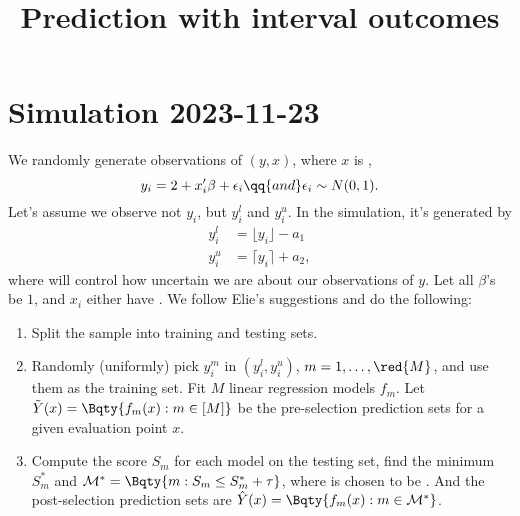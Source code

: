 \documentclass[12pt]{article}
\begin{document}
    \title{Prediction with interval outcomes}

    \section{Simulation 2023-11-23}

    We randomly generate  observations of \((y,x)\), where \(x\) is ,
    \begin{equation*}
        y_{i} = 2 + x_{i}' \beta + \epsilon_{i}\qq{and} \epsilon_{i} \sim N(0,1).
    \end{equation*}
    Let's assume we observe not \(y_{i}\), but \(y^{l}_{i}\) and \(y_{i}^{u}\). In the simulation, it's generated by 
    \begin{align*}
        y_{i}^{l} &= \lfloor y_{i} \rfloor - a_{1} \\
        y_{i}^{u} &= \lceil y_{i} \rceil  + a_{2},
    \end{align*}
    where  will control how uncertain we are about our observations of \(y\). Let all \(\beta\)'s be \(1\), and \(x_{i}\) either have . We follow Elie's suggestions and do the following:
    \begin{enumerate}
        \item Split the sample into training and testing sets. 
        \item Randomly (uniformly) pick \(y^{m}_{i}\) in \((y^{l}_{i}, y^{u}_{i})\), \(m = 1,\dots, \red{M}\), and use them as the training set. Fit \(M\) linear regression models \(f_{m}\). Let \(\tilde{Y}(x) = \Bqty{f_{m}(x): m\in [M]}\) be the pre-selection prediction sets for a given evaluation point \(x\).
        \item Compute the score \(S_{m}\) for each model on the testing set, find the  minimum \(S_{m}^{*}\) and \(\mathcal{M}^{*} = \Bqty{m: S_{m} \leq S_{m}^{*} + \tau}\), where \red{\(\tau\)} is chosen to be . And the post-selection prediction sets are \(\hat{Y}(x) = \Bqty{f_{m}(x): m\in \mathcal{M}^{*}}\).
    \end{enumerate}
    
\end{document}
